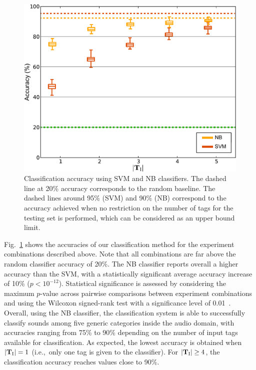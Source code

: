 \begin{figure}
	\centering
		\includegraphics[width=\figSizeMid]{ch04_class/pics/classifier_results.pdf}
	\caption[Classification accuracy of the audio class detection step using SVM and NB classifiers]{Classification accuracy using SVM and NB classifiers. The dashed line at 20\% accuracy corresponds to the random baseline. The dashed lines around 95\% (SVM) and 90\% (NB) correspond to the accuracy achieved when no restriction on the number of tags for the testing set is performed, which can be considered as an upper bound limit.  
}
	\label{fig:classification_main_results}
\end{figure}

Fig.~\ref{fig:classification_main_results} shows the accuracies of our classification method for the experiment combinations described above. %
Note that all combinations are far above the random classifier accuracy of 20\%. The NB classifier reports overall a higher accuracy than the SVM, with a statistically significant average accuracy increase of 10\% ($p<10^{-12}$). Statistical significance is assessed by considering the maximum $p$-value across pairwise comparisons between experiment combinations and using the Wilcoxon signed-rank test with a significance level of 0.01~\citep{Corder2009}.
Overall, using the NB classifier, the classification system is able to successfully classify sounds among five generic categories inside the audio domain, with accuracies ranging from 75\% to 90\% depending on the number of input tags available for classification. 
As expected, the lowest accuracy is obtained when $|\mathbf{T}_{\text{I}}| = 1$ (i.e.,~only one tag is given to the classifier). For $|\mathbf{T}_{\text{I}}| \geq 4$, the classification accuracy reaches values close to 90\%. 

